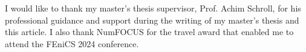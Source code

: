 \begin{acknowledgement}
    I would like to thank my master's thesis supervisor, Prof. Achim Schroll, for his professional guidance and support during the writing of my master's thesis and this article. I also thank NumFOCUS for the travel award that enabled me to attend the FEniCS 2024 conference. 
\end{acknowledgement}





